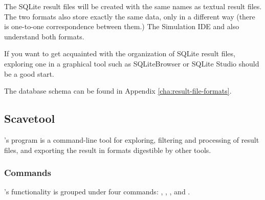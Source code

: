The SQLite result files will be created with the same names as textual
result files. The two formats also store exactly the same data, only in
a different way (there is one-to-one correspondence between them.) The
Simulation IDE and  also understand both formats.

\begin{hint}
If you want to get acquainted with the organization of SQLite result
files, exploring one in a graphical tool such as SQLiteBrowser or SQLite
Studio should be a good start.
\end{hint}

The database schema can be found in Appendix \ref{cha:result-file-formats}.



\subsection{Scavetool}
\label{sec:ana-sim:scavetool}

{\opp}'s  program is a command-line tool for exploring,
filtering and processing of result files, and exporting the result in formats
digestible by other tools.

\subsubsection{Commands}
\label{sec:ana-sim:scavetool:commands}

's functionality is grouped under four commands:
, , , and .

